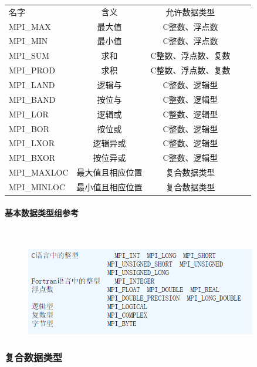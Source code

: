 \documentclass[UTF8]{article}%
\begin{document}
\begin{tabular}{l c c c r}
        名字         &       含义            &   允许数据类型        \\
        MPI\_MAX     &      最大值           &   C整数、浮点数       \\  
        MPI\_MIN     &      最小值           &   C整数、浮点数       \\
        MPI\_SUM     &      求和             &   C整数、浮点数、复数 \\
        MPI\_PROD    &      求积             &   C整数、浮点数、复数 \\
        MPI\_LAND    &      逻辑与           &   C整数、逻辑型       \\
        MPI\_BAND    &      按位与           &   C整数、逻辑型       \\
        MPI\_LOR     &      逻辑或           &   C整数、逻辑型       \\
        MPI\_BOR     &      按位或           &   C整数、逻辑型       \\
        MPI\_LXOR    &      逻辑异或         &   C整数、逻辑型       \\
        MPI\_BXOR    &      按位异或         &   C整数、逻辑型       \\
        MPI\_MAXLOC  &      最大值且相应位置  &   复合数据类型        \\
        MPI\_MINLOC  &      最小值且相应位置  &   复合数据类型        \\
    
\end{tabular}

\paragraph{基本数据类型组参考}~{}

\begin{figure}[htb!]%
    \includegraphics[width=0.9\textwidth]{8-1.png}
\end{figure}

\subsubsection{复合数据类型}
\end{document}
